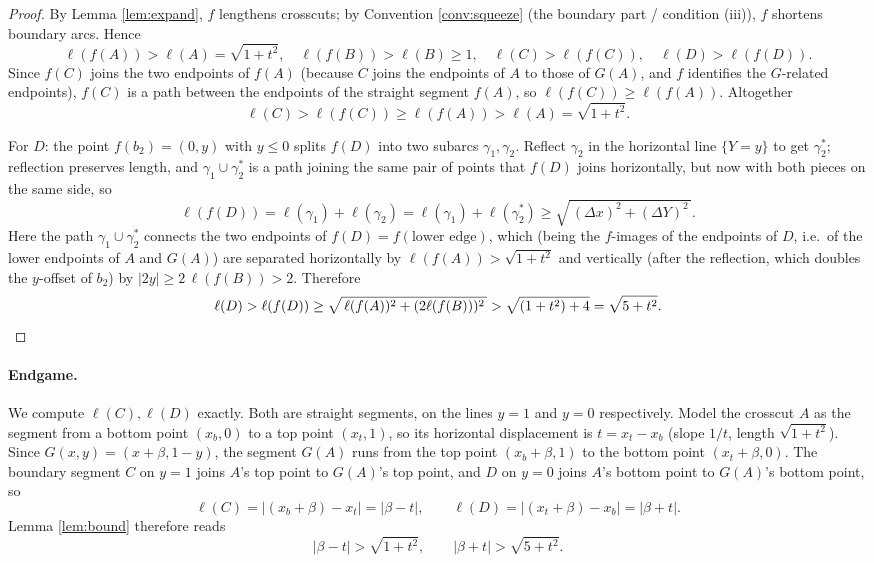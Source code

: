 \documentclass[12pt]{article}
\begin{document}
\begin{proof}
By Lemma \ref{lem:expand}, $f$ lengthens crosscuts; by Convention
\ref{conv:squeeze} (the boundary part / condition (iii)), $f$ shortens
boundary arcs. Hence
\[
\ell(f(A))>\ell(A)=\sqrt{1+t^2},\quad
\ell(f(B))>\ell(B)\ge1,\quad
\ell(C)>\ell(f(C)),\quad \ell(D)>\ell(f(D)).
\]
Since $f(C)$ joins the two endpoints of $f(A)$ (because $C$ joins the
endpoints of $A$ to those of $G(A)$, and $f$ identifies the $G$-related
endpoints), $f(C)$ is a path between the endpoints of the straight
segment $f(A)$, so $\ell(f(C))\ge\ell(f(A))$. Altogether
\[
\ell(C)>\ell(f(C))\ge\ell(f(A))>\ell(A)=\sqrt{1+t^2}.
\]

For $D$: the point $f(b_2)=(0,y)$ with $y\le0$ splits $f(D)$ into two
subarcs $\gamma_1,\gamma_2$. Reflect $\gamma_2$ in the horizontal line
$\{Y=y\}$ to get $\gamma_2^*$; reflection preserves length, and
$\gamma_1\cup\gamma_2^*$ is a path joining the same pair of points that
$f(D)$ joins horizontally, but now with both pieces on the same side, so
\[
\ell(f(D))=\ell(\gamma_1)+\ell(\gamma_2)
=\ell(\gamma_1)+\ell(\gamma_2^*)
\ge\sqrt{\,(\Delta x)^2+(\Delta Y)^2\,}.
\]
Here the path $\gamma_1\cup\gamma_2^*$ connects the two endpoints of
$f(D)=f(\text{lower edge})$, which (being the $f$-images of the endpoints
of $D$, i.e.\ of the lower endpoints of $A$ and $G(A)$) are separated
horizontally by $\ell(f(A))>\sqrt{1+t^2}$ and vertically (after the
reflection, which doubles the $y$-offset of $b_2$) by
$|2y|\ge 2\,\ell(f(B))>2$. Therefore
\[
\ell(D)>\ell(f(D))\ge\sqrt{\,\ell(f(A))^2+(2\ell(f(B)))^2\,}
>\sqrt{(1+t^2)+4}=\sqrt{5+t^2}. \qedhere
\]
\end{proof}

\paragraph{Endgame.} We compute $\ell(C),\ell(D)$ exactly. Both are
straight segments, on the lines $y=1$ and $y=0$ respectively. Model the
crosscut $A$ as the segment from a bottom point $(x_b,0)$ to a top point
$(x_t,1)$, so its horizontal displacement is $t=x_t-x_b$ (slope $1/t$,
length $\sqrt{1+t^2}$). Since $G(x,y)=(x+\beta,1-y)$, the segment $G(A)$
runs from the top point $(x_b+\beta,1)$ to the bottom point
$(x_t+\beta,0)$. The boundary segment $C$ on $y=1$ joins $A$'s top point
to $G(A)$'s top point, and $D$ on $y=0$ joins $A$'s bottom point to
$G(A)$'s bottom point, so
\[
\ell(C)=\big|(x_b+\beta)-x_t\big|=|\beta-t|,\qquad
\ell(D)=\big|(x_t+\beta)-x_b\big|=|\beta+t|.
\]
Lemma \ref{lem:bound} therefore reads
\begin{equation}\label{eq:two}
|\beta-t|>\sqrt{1+t^2},\qquad |\beta+t|>\sqrt{5+t^2}.
\end{equation}
\end{document}
